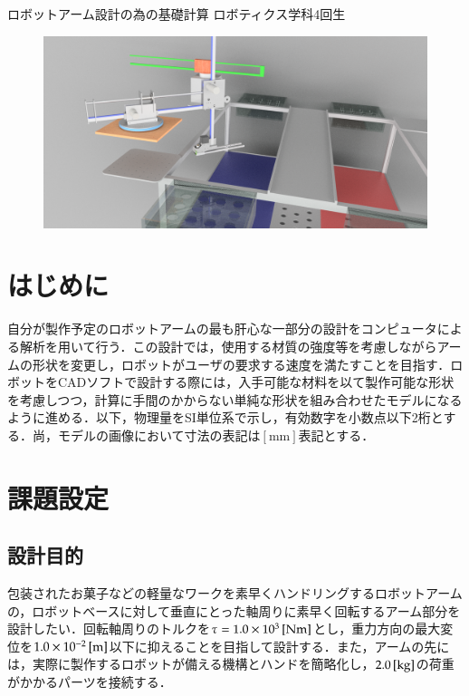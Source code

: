 \documentclass[10pt,b5paper,papersize,dvipdfmx]{jsbook}
\begin{document}

\newcommand\abesec[1]{\ref{#1}節}


\kaishititle%
  {ロボットアーム設計の為の基礎計算}%
  {ロボティクス学科4回生}%
  {}%

\begin{figure}[htbp]
  \centering
  \includegraphics[width=12cm]{img/robot_and_field.png}
\end{figure}

%
\section*{はじめに}
自分が製作予定のロボットアームの最も肝心な一部分の設計をコンピュータによる解析を用いて行う．この設計では，使用する材質の強度等を考慮しながらアームの形状を変更し，ロボットがユーザの要求する速度を満たすことを目指す．ロボットをCADソフトで設計する際には，入手可能な材料を以て製作可能な形状を考慮しつつ，計算に手間のかからない単純な形状を組み合わせたモデルになるように進める．以下，物理量をSI単位系で示し，有効数字を小数点以下2桁とする．尚，モデルの画像において寸法の表記は$[\mathrm{mm}]$表記とする．

%
\section{課題設定}
\subsection{設計目的}
包装されたお菓子などの軽量なワークを素早くハンドリングするロボットアームの，ロボットベースに対して垂直にとった軸周りに素早く回転するアーム部分を設計したい．回転軸周りのトルクを$\tau =1.0 \times 10^3 \tani*{Nm}$とし，重力方向の最大変位を$1.0 \times 10^{-2} \tani*{m}$以下に抑えることを目指して設計する．また，アームの先には，実際に製作するロボットが備える機構とハンドを簡略化し，$2.0 \tani*{kg}$の荷重がかかるパーツを接続する．
\end{document}
